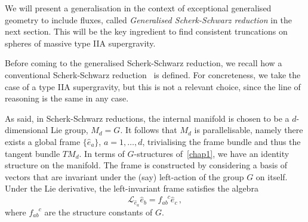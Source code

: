 \documentclass[debug]{phd}
\begin{document}
				We will present a generalisation in the context of exceptional generalised geometry to include fluxes, called \emph{Generalised Scherk-Schwarz reduction} in the next section. 
				This will be the key ingredient to find consistent truncations on spheres of massive type IIA supergravity.
				
				Before coming to the generalised Scherk-Schwarz reduction, we recall how a conventional Scherk-Schwarz reduction~\cite{Scherk:1979zr} is defined.
				For concreteness, we take the case of a type IIA supergravity, but this is not a relevant choice, since the line of reasoning is the same in any case.
				
				As said, in Scherk-Schwarz reductions, the internal manifold is chosen to be a $d$-dimensional Lie group, $M_d = G$. 
				It follows that $M_d$ is parallelisable, namely there exists a global frame $\{\hat{e}_a\}$, $a=1,\ldots,d$, trivialising the frame bundle and thus the tangent bundle $TM_d$.
				In terms of $G$-structures of~\cref{chap1}, we have an identity structure on the manifold. 
				The frame is constructed by considering a basis of vectors that are invariant under the (say) left-action of the group $G$ on itself. 
				Under the Lie derivative, the left-invariant frame satisfies the algebra
						\begin{equation}
							\mathcal{L}_{\hat{e}_a}\hat{e}_b = f_{ab}^{\phantom{ab}c} \hat{e}_c\, ,
						\end{equation}
				where $f_{ab}^{\phantom{ab}c}$ are the structure constants of $G$.
				
\end{document}
